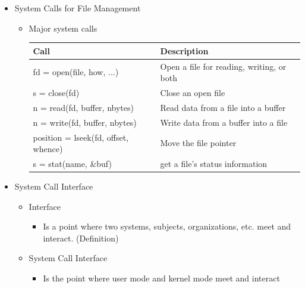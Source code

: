 \documentclass[12pt]{article}
\begin{document}
\begin{itemize}
\begin{mdframed}
\begin{itemize}
        \end{itemize}
    \end{mdframed}

    \item System Calls for File Management

    \begin{itemize}
        \item Major system calls

        \begin{tabular}{|l|l|}
            \hline
            \textbf{Call} & \textbf{Description}\\
            \hline
            fd = open(file, how, ...) & Open a file for reading, writing, or both\\
            \hline
            s = close(fd) & Close an open file\\
            \hline
            n = read(fd, buffer, nbytes) & Read data from a file into a buffer\\
            \hline
            n = write(fd, buffer, nbytes) & Write data from a buffer into a file\\
            \hline
            position = lseek(fd, offset, whence) & Move the file pointer\\
            \hline
            s = stat(name, \&buf) & get a file's status information\\
            \hline
        \end{tabular}
    \end{itemize}

    \item System Call Interface
    \begin{itemize}
        \item Interface
        \begin{itemize}
            \item Is a point where two systems, subjects, organizations, etc.
            meet and interact. (Definition)
        \end{itemize}
        \item System Call Interface
        \begin{itemize}
            \item Is the point where user mode and kernel mode meet and interact


\end{itemize}
\end{itemize}
\end{itemize}
\end{document}
